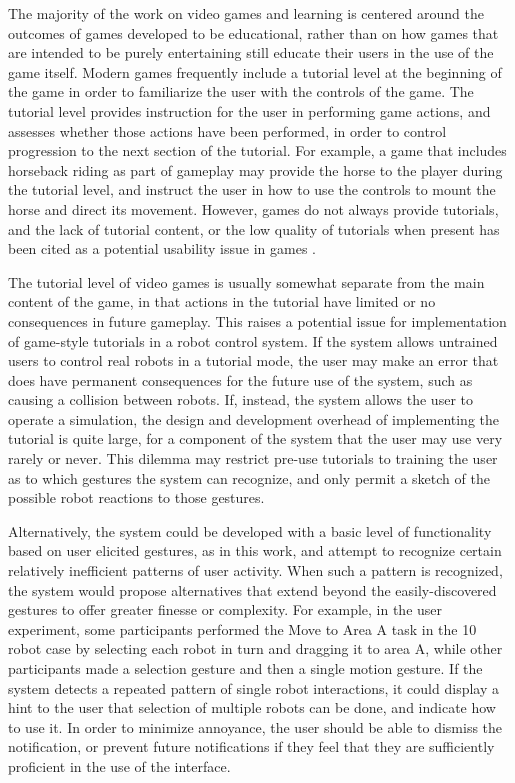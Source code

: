The majority of the work on video games and learning is centered around the outcomes of games developed to be educational, rather than on how games that are intended to be purely entertaining still educate their users in the use of the game itself.
Modern games frequently include a tutorial level at the beginning of the game in order to familiarize the user with the controls of the game. 
The tutorial level provides instruction for the user in performing game actions, and assesses whether those actions have been performed, in order to control progression to the next section of the tutorial. 
For example, a game that includes horseback riding as part of gameplay may provide the horse to the player during the tutorial level, and instruct the user in how to use the controls to mount the horse and direct its movement. 
However, games do not always provide tutorials, and the lack of tutorial content, or the low quality of tutorials when present has been cited as a potential usability issue in games \citep{pinelle2008heuristic}.

The tutorial level of video games is usually somewhat separate from the main content of the game, in that actions in the tutorial have limited or no consequences in future gameplay. 
This raises a potential issue for implementation of game-style tutorials in a robot control system. 
If the system allows untrained users to control real robots in a tutorial mode, the user may make an error that does have permanent consequences for the future use of the system, such as causing a collision between robots. 
If, instead, the system allows the user to operate a simulation, the design and development overhead of implementing the tutorial is quite large, for a component of the system that the user may use very rarely or never. 
This dilemma may restrict pre-use tutorials to training the user as to which gestures the system can recognize, and only permit a sketch of the possible robot reactions to those gestures. 

Alternatively, the system could be developed with a basic level of functionality based on user elicited gestures, as in this work, and attempt to recognize certain relatively inefficient patterns of user activity. 
When such a pattern is recognized, the system would propose alternatives that extend beyond the easily-discovered gestures to offer greater finesse or complexity. 
For example, in the user experiment, some participants performed the Move to Area A task in the 10 robot case by selecting each robot in turn and dragging it to area A, while other participants made a selection gesture and then a single motion gesture. 
If the system detects a repeated pattern of single robot interactions, it could display a hint to the user that selection of multiple robots can be done, and indicate how to use it. 
In order to minimize annoyance, the user should be able to dismiss the notification, or prevent future notifications if they feel that they are sufficiently proficient in the use of the interface. 

